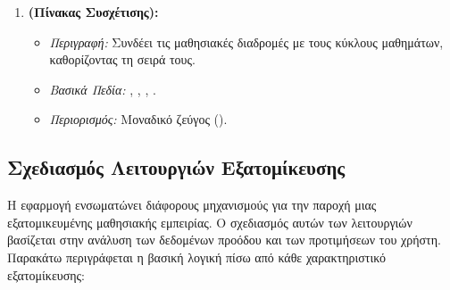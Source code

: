 \begin{enumerate}[leftmargin=*, label=\arabic*., wide, labelwidth=!, labelindent=0pt, itemsep=1ex]
    \item \textbf{\texttt{} (Πίνακας Συσχέτισης):}
        \begin{itemize}[leftmargin=1.5em, noitemsep]
            \item \textit{Περιγραφή:} Συνδέει τις μαθησιακές διαδρομές με τους κύκλους μαθημάτων, καθορίζοντας τη σειρά τους.
            \item \textit{Βασικά Πεδία:} \texttt{}, \texttt{}, \texttt{}, \texttt{}.
            \item \textit{Περιορισμός:} Μοναδικό ζεύγος (\texttt{}).
        \end{itemize}
\end{enumerate}

\subsection{Σχεδιασμός Λειτουργιών Εξατομίκευσης}
\label{sec:logiki_exatomikeusis}
Η εφαρμογή ενσωματώνει διάφορους μηχανισμούς για την παροχή μιας εξατομικευμένης μαθησιακής εμπειρίας. Ο σχεδιασμός αυτών των λειτουργιών βασίζεται στην ανάλυση των δεδομένων προόδου και των προτιμήσεων του χρήστη. Παρακάτω περιγράφεται η βασική λογική πίσω από κάθε χαρακτηριστικό εξατομίκευσης:

